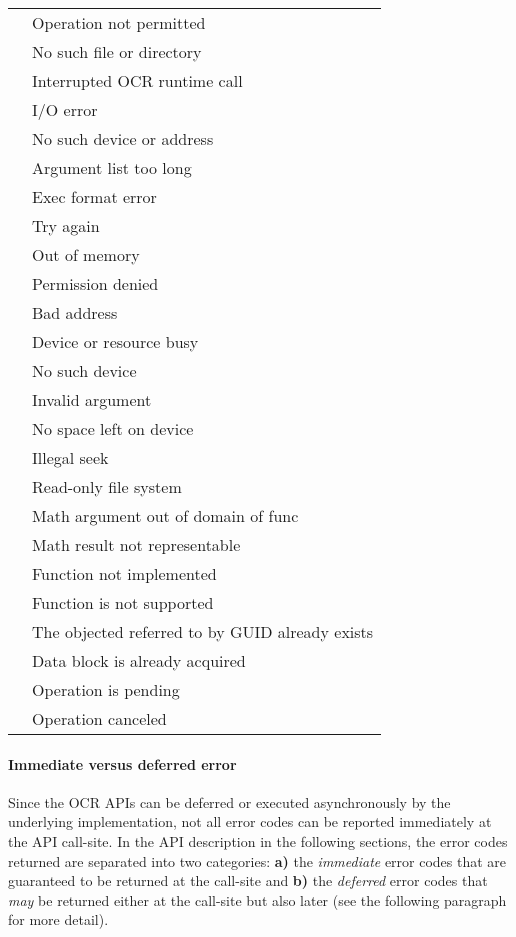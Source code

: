 \begin{supertabular}{p{1.25in} p{2.75in}}
\label{tab:errorcodes}
 & Operation not permitted\\
 & No such file or directory\\
 & Interrupted OCR runtime call\\
 & I/O error\\
 & No such device or address\\
 & Argument list too long\\
 & Exec format error\\
 & Try again\\
 & Out of memory\\
 & Permission denied\\
 & Bad address\\
 & Device or resource busy\\
 & No such device\\
 & Invalid argument\\
 & No space left on device\\
 & Illegal seek\\
 & Read-only file system\\
 & Math argument out of domain of func\\
 & Math result not representable\\
 & Function not implemented\\
 & Function is not supported\\
 & The objected referred to by GUID already exists\\
 & Data block is already acquired\\
 & Operation is pending\\
 & Operation canceled\\
\end{supertabular}
%
\paragraph*{Immediate versus deferred error}
Since the OCR APIs can be deferred or executed asynchronously by the underlying
implementation, not all error codes can be reported immediately at the API call-site. In the
API description in the following sections, the error codes returned are separated into
two categories: {\bf a)} the \emph{immediate} error codes that are guaranteed to be returned at the call-site and
{\bf b)} the \emph{deferred} error codes that \emph{may} be returned either at the call-site but also
later (see the following paragraph for more detail).

